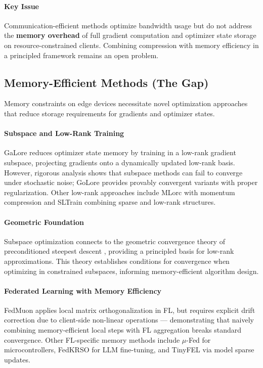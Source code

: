 \paragraph{Key Issue}
Communication-efficient methods optimize bandwidth usage but do not address the \textbf{memory overhead} of full gradient computation and optimizer state storage on resource-constrained clients. Combining compression with memory efficiency in a principled framework remains an open problem.

\subsection{Memory-Efficient Methods (The Gap)}

Memory constraints on edge devices necessitate novel optimization approaches that reduce storage requirements for gradients and optimizer states.

\paragraph{Subspace and Low-Rank Training}
GaLore \cite{zhao2024galore} reduces optimizer state memory by training in a low-rank gradient subspace, projecting gradients onto a dynamically updated low-rank basis. However, rigorous analysis \cite{he2024golore} shows that subspace methods can fail to converge under stochastic noise; GoLore provides provably convergent variants with proper regularization. Other low-rank approaches include MLorc \cite{shen2025mlorc} with momentum compression and SLTrain \cite{han2024sltrain} combining sparse and low-rank structures.

\paragraph{Geometric Foundation}
Subspace optimization connects to the geometric convergence theory of preconditioned steepest descent \cite{neymeyer2012geometric}, providing a principled basis for low-rank approximations. This theory establishes conditions for convergence when optimizing in constrained subspaces, informing memory-efficient algorithm design.

\paragraph{Federated Learning with Memory Efficiency}
FedMuon \cite{liu2025fedmuon} applies local matrix orthogonalization in FL, but requires explicit drift correction due to client-side non-linear operations — demonstrating that naively combining memory-efficient local steps with FL aggregation breaks standard convergence. Other FL-specific memory methods include $\mu$-Fed \cite{li2025mufed} for microcontrollers, FedKRSO \cite{yang2026fedkrso} for LLM fine-tuning, and TinyFEL \cite{chen2025tinyfel} via model sparse updates.

